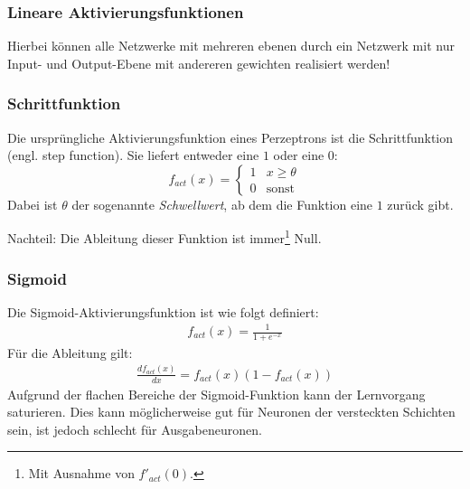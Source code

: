 \subsubsection*{Lineare Aktivierungsfunktionen}
Hierbei können alle Netzwerke mit mehreren ebenen durch ein Netzwerk mit nur Input- und Output-Ebene mit andereren gewichten realisiert werden!

\subsubsection*{Schrittfunktion}
Die ursprüngliche Aktivierungsfunktion eines Perzeptrons ist die Schrittfunktion (engl. step function). Sie liefert entweder eine $1$ oder eine $0$:
\[
	f_{act}(x) = 
	\begin{cases}
		1 & x \geq \theta \\
		0 & \text{sonst} 
	\end{cases}
\]
Dabei ist $\theta$ der sogenannte \emph{Schwellwert}, ab dem die Funktion eine $1$ zurück gibt.

Nachteil: Die Ableitung dieser Funktion ist immer\footnote{Mit Ausnahme von $f'_{act}(0)$.} Null. 


\subsubsection*{Sigmoid}
Die Sigmoid-Aktivierungsfunktion ist wie folgt definiert: 
\begin{align*}
	f_{act}(x) = \frac{1}{1 + e^{-x}}
\end{align*}
Für die Ableitung gilt:
\begin{align*}
	\frac{d f_{act}(x)}{dx} =
		f_{act}(x) (1 - f_{act}(x))
\end{align*}
Aufgrund der flachen Bereiche der Sigmoid-Funktion kann der Lernvorgang saturieren. Dies kann möglicherweise gut für Neuronen der versteckten Schichten sein, ist jedoch schlecht für Ausgabeneuronen.

